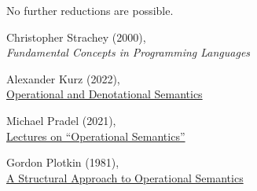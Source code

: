 \documentclass{article}
\begin{document}
No further reductions are possible.
\plush{}


Christopher Strachey (2000),\\
\emph{Fundamental Concepts in Programming Languages}

Alexander Kurz (2022),\\
\href{https://hackmd.io/@alexhkurz/Hkf6BTL6P}{Operational and Denotational Semantics}

Michael Pradel (2021),\\
\href{https://www.youtube.com/watch?v=jsBHd3-04oA}{Lectures on ``Operational Semantics''}

Gordon Plotkin (1981),\\
\href{https://web.eecs.umich.edu/~weimerw/2006-615/reading/plotkin81structural.pdf}{A Structural Approach to Operational Semantics}
\end{document}
